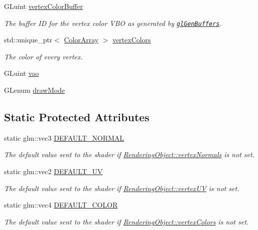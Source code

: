 \begin{DoxyCompactItemize}
G\+Luint \hyperlink{class_rendering_object_aeb014a4ef24e2fc4665a769241660cad}{vertex\+Color\+Buffer}
\begin{DoxyCompactList}\small\item\em The buffer ID for the vertex color V\+BO as generated by \href{https://www.opengl.org/sdk/docs/man/html/glGenBuffers.xhtml}{\tt gl\+Gen\+Buffers}. \end{DoxyCompactList}\item 
std\+::unique\+\_\+ptr$<$ \hyperlink{class_rendering_object_a8a12e1f9be788d99af6c089e1c600022}{Color\+Array} $>$ \hyperlink{class_rendering_object_a65fc52e665791ce55e43106b603e917a}{vertex\+Colors}
\begin{DoxyCompactList}\small\item\em The color of every vertex. \end{DoxyCompactList}\item 
G\+Luint \hyperlink{class_rendering_object_a96dd05670a977a949514a2c490c1c867}{vao}
\item 
G\+Lenum \hyperlink{class_rendering_object_aa67856a72705b54a5667e91e270d00b3}{draw\+Mode}
\end{DoxyCompactItemize}
\subsection*{Static Protected Attributes}
\begin{DoxyCompactItemize}
\item 
static glm\+::vec3 \hyperlink{class_rendering_object_af270a476ba12c23fefbb034e21930add}{D\+E\+F\+A\+U\+L\+T\+\_\+\+N\+O\+R\+M\+AL}
\begin{DoxyCompactList}\small\item\em The default value sent to the shader if \hyperlink{class_rendering_object_ac28d301f97d29ab603f65f8e823063b4}{Rendering\+Object\+::vertex\+Normals} is not set. \end{DoxyCompactList}\item 
static glm\+::vec2 \hyperlink{class_rendering_object_a3dcb28a12f578630aea75cc59ea39588}{D\+E\+F\+A\+U\+L\+T\+\_\+\+UV}
\begin{DoxyCompactList}\small\item\em The default value sent to the shader if \hyperlink{class_rendering_object_afc405316bddec4ba1d5c228ecc0d9061}{Rendering\+Object\+::vertex\+UV} is not set. \end{DoxyCompactList}\item 
static glm\+::vec4 \hyperlink{class_rendering_object_a3bf21996dc0ef604b2b81d95275c97f9}{D\+E\+F\+A\+U\+L\+T\+\_\+\+C\+O\+L\+OR}
\begin{DoxyCompactList}\small\item\em The default value sent to the shader if \hyperlink{class_rendering_object_a65fc52e665791ce55e43106b603e917a}{Rendering\+Object\+::vertex\+Colors} is not set. \end{DoxyCompactList}\end{DoxyCompactItemize}
